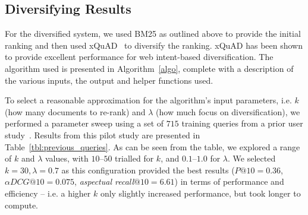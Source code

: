 \subsection{Diversifying Results}
For the diversified system, we used BM25 as outlined above to provide the initial ranking and then used xQuAD~\cite{santos2010query_reformulations_diversification} to diversify the ranking. xQuAD has been shown to provide excellent performance for web intent-based diversification. The algorithm used is presented in Algorithm~\ref{algo}, complete with a description of the various inputs, the output and helper functions used.

To select a reasonable approximation for the algorithm's input parameters, i.e. $k$ (how many documents to re-rank) and $\lambda$ (how much focus on diversification), we performed a parameter sweep using a set of $715$ training queries from a prior user study~\cite{maxwell2017snippet_length}. Results from this pilot study are presented in Table~\ref{tbl:previous_queries}. As can be seen from the table, we explored a range of $k$ and $\lambda$ values, with $10$--$50$ trialled for $k$, and $0.1$--$1.0$ for $\lambda$. We selected $k=30, \lambda=0.7$ as this configuration provided the best results ($P@10=0.36$, $\alpha DCG@10=0.075$, \emph{aspectual recall}$@10=6.61$) in terms of performance and efficiency -- i.e. a higher $k$ only slightly increased performance, but took longer to compute.

